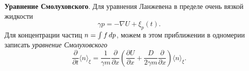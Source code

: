 \textbf{Уравнение Смолуховского}. Для уравнения Ланжевена в пределе очень вязкой жидкости
\begin{equation*}
	\gamma p = - \nabla U +\xi_p (t).
\end{equation*}
Для концентрации частиц $n = \int f \, d p$, можем в этом приближении в одномерии записать \textit{уравнение Смолуховского}
\begin{equation*}
	\frac{\partial }{\partial t} \langle n\rangle_\xi = \frac{1}{\gamma m} \frac{\partial }{\partial x} \left(
		\frac{\partial U}{\partial x}  + \frac{D}{2\gamma m} \frac{\partial }{\partial x} 
	\right) \langle n\rangle_\xi.
\end{equation*}
